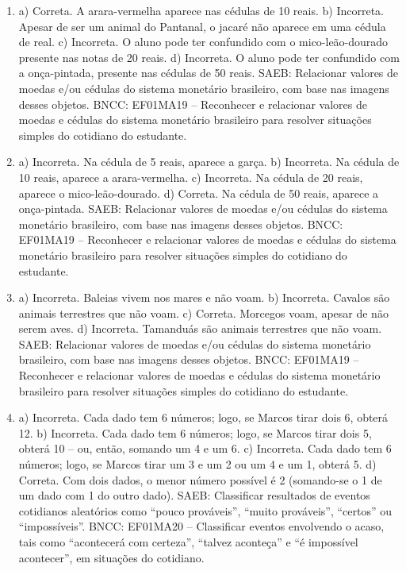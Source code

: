 \begin{enumerate}
\item
a) Correta. A arara-vermelha aparece nas cédulas de 10 reais.
b) Incorreta. Apesar de ser um animal do Pantanal, o jacaré não aparece em uma cédula de real.
c) Incorreta. O aluno pode ter confundido com o mico-leão-dourado
presente nas notas de 20 reais.
d) Incorreta. O aluno pode ter confundido com a onça-pintada, presente
nas cédulas de 50 reais.
SAEB: Relacionar valores de moedas e/ou cédulas do sistema
monetário brasileiro, com base nas imagens desses objetos.
BNCC: EF01MA19 -- Reconhecer e relacionar valores de moedas e cédulas do
sistema monetário brasileiro para resolver situações simples do
cotidiano do estudante.

\item
a) Incorreta. Na cédula de 5 reais, aparece a garça.
b) Incorreta. Na cédula de 10 reais, aparece a arara-vermelha.
c) Incorreta. Na cédula de 20 reais, aparece o mico-leão-dourado.
d) Correta. Na cédula de 50 reais, aparece a onça-pintada.
SAEB: Relacionar valores de moedas e/ou cédulas do sistema
monetário brasileiro, com base nas imagens desses objetos.
BNCC: EF01MA19 -- Reconhecer e relacionar valores de moedas e cédulas do
sistema monetário brasileiro para resolver situações simples do
cotidiano do estudante.

\item
a) Incorreta. Baleias vivem nos mares e não voam.
b) Incorreta. Cavalos são animais terrestres que não voam.
c) Correta. Morcegos voam, apesar de não serem aves.
d) Incorreta. Tamanduás são animais terrestres que não voam.
SAEB: Relacionar valores de moedas e/ou cédulas do sistema
monetário brasileiro, com base nas imagens desses objetos.
BNCC: EF01MA19 -- Reconhecer e relacionar valores de moedas e cédulas do
sistema monetário brasileiro para resolver situações simples do
cotidiano do estudante.

\item
a) Incorreta. Cada dado tem 6 números; logo, se Marcos tirar dois 6,
obterá 12.
b) Incorreta. Cada dado tem 6 números; logo, se Marcos tirar dois 5,
obterá 10 -- ou, então, somando um 4 e um 6.
c) Incorreta. Cada dado tem 6 números; logo, se Marcos tirar um 3 e um
2 ou um 4 e um 1, obterá 5.
d) Correta. Com dois dados, o menor número possível é 2 (somando-se o 1 de um dado com 1 do outro dado).
SAEB: Classificar resultados de eventos cotidianos aleatórios como
``pouco prováveis'', ``muito prováveis'', ``certos'' ou ``impossíveis''.
BNCC: EF01MA20 -- Classificar eventos envolvendo o acaso, tais como
``acontecerá com certeza'', ``talvez aconteça'' e ``é impossível
acontecer'', em situações do cotidiano.


\end{enumerate}
